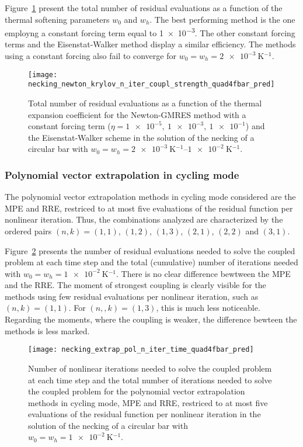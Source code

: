 Figure~\ref{fig:necking_newton_krylov_n_iter_coupl_strength_quad4fbar_pred} present the total number of residual evaluations as a function of the thermal softening parameters \(w_0\) and \(w_h\).
The best performing method is the one employng a constant forcing term equal to \num{1e-3}.
The other constant forcing terms and the Eisenstat-Walker method display a similar efficiency.
The methods using a constant forcing also fail to converge for \(w_0=w_h=\SI{2e-3}{\kelvin^{-1}}\).

\begin{figure}
  \centering
  \texttt{[image: necking\_newton\_krylov\_n\_iter\_coupl\_strength\_quad4fbar\_pred]}
  \caption{Total number of residual evaluations as a function of the thermal expansion coefficient for the Newton-GMRES method with a constant forcing term (\(\eta=\num{1e-5},\ \num{1e-3},\ \num{1e-1}\)) and the Eisenstat-Walker scheme in the solution of the necking of a circular bar with \(w_0=w_h=\SIrange{2e-3}{1e-2}{\kelvin^{-1}}\).}
\label{fig:necking_newton_krylov_n_iter_coupl_strength_quad4fbar_pred}
\end{figure}

\FloatBarrier

\subsubsection{Polynomial vector extrapolation in cycling mode}

The polynomial vector extrapolation methods in cycling mode considered are the MPE and RRE, restriced to at most five evaluations of the residual function per nonlinear iteration.
Thus, the combinations analyzed are characterized by the ordered pairs \((n,k)=(1,1)\), \((1,2)\), \((1,3)\), \((2,1)\), \((2,2)\) and \((3,1)\).

Figure~\ref{fig:necking_extrap_pol_n_iter_time_quad4fbar_pred} presents the number of residual evaluations needed to solve the coupled problem at each time step and the total (cumulative) number of iterations needed with \(w_0=w_h=\SI{1e-2}{\kelvin^{-1}}\).
There is no clear difference bewtween the MPE and the RRE.
The moment of strongest coupling is clearly visible for the methods using few residual evaluations per nonlinear iteration, such as \((n,k)=(1,1)\).
For \((n,,k)=(1,3)\), this is much less noticeable.
Regarding the moments, where the coupling is weaker, the difference bewteen the methods is less marked.

\begin{figure}[htbp]
  \centering
  \texttt{[image: necking\_extrap\_pol\_n\_iter\_time\_quad4fbar\_pred]}
  \caption{Number of nonlinear iterations needed to solve the coupled problem at each time step and the total number of iterations needed to solve the coupled problem for the polynomial vector extrapolation methods in cycling mode, MPE and RRE, restriced to at most five evaluations of the residual function per nonlinear iteration in the solution of the necking of a circular bar with \(w_0=w_h=\SI{1e-2}{\kelvin^{-1}}\).}
\label{fig:necking_extrap_pol_n_iter_time_quad4fbar_pred}
\end{figure}

